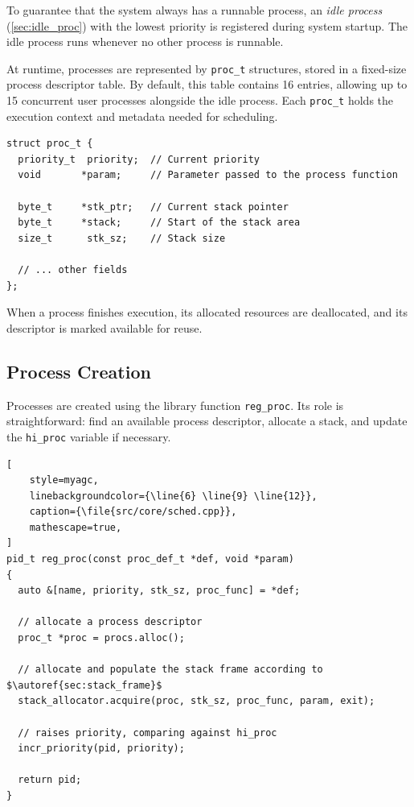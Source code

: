 To guarantee that the system always has a runnable process, an \emph{idle process}
(\autoref{sec:idle_proc}) with the lowest priority is registered during system startup.
The idle process runs whenever no other process is runnable.

At runtime, processes are represented by \lstinline[style=myagc]|proc_t| structures,
stored in a fixed-size process descriptor table. By default, this table contains 16
entries, allowing up to 15 concurrent user processes alongside the idle process.
Each \lstinline[style=myagc]|proc_t| holds the execution context and metadata needed
for scheduling.

\begin{lstlisting}[style=myagc, caption={\file{include/core/procs.h}}]
struct proc_t {
  priority_t  priority;  // Current priority
  void       *param;     // Parameter passed to the process function

  byte_t     *stk_ptr;   // Current stack pointer
  byte_t     *stack;     // Start of the stack area
  size_t      stk_sz;    // Stack size

  // ... other fields
};
\end{lstlisting}

When a process finishes execution, its allocated resources are deallocated, and its
descriptor is marked available for reuse.


\subsection{Process Creation}

Processes are created using the library function \lstinline[style=myagc]|reg_proc|. Its
role is straightforward: find an available process descriptor, allocate a stack, and
update the \lstinline[style=myagc]|hi_proc| variable if necessary.

\begin{lstlisting}[
    style=myagc,
    linebackgroundcolor={\line{6} \line{9} \line{12}},
    caption={\file{src/core/sched.cpp}},
    mathescape=true,
]
pid_t reg_proc(const proc_def_t *def, void *param)
{
  auto &[name, priority, stk_sz, proc_func] = *def;

  // allocate a process descriptor
  proc_t *proc = procs.alloc();  

  // allocate and populate the stack frame according to $\autoref{sec:stack_frame}$
  stack_allocator.acquire(proc, stk_sz, proc_func, param, exit);

  // raises priority, comparing against hi_proc 
  incr_priority(pid, priority);  

  return pid;
}
\end{lstlisting}


